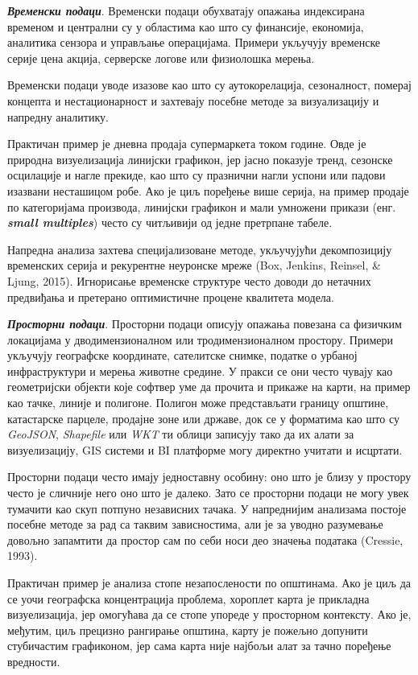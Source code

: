 \textbf{\textit{Временски подаци}}. Временски подаци обухватају опажања индексирана временом и централни су у областима као што су финансије, економија, аналитика сензора и управљање операцијама. Примери укључују временске серије цена акција, серверске логове или физиолошка мерења.

Временски подаци уводе изазове као што су аутокорелација, сезоналност, померај концепта и нестационарност и захтевају посебне методе за визуализацију и напредну аналитику.

Практичан пример је дневна продаја супермаркета током године. Овде је природна визуелизација линијски графикон, јер јасно показује тренд, сезонске осцилације и нагле прекиде, као што су празнични нагли успони или падови изазвани несташицом робе. Ако је циљ поређење више серија, на пример продаје по категоријама производа, линијски графикон и мали умножени прикази (енг. \textbf{\textit{small multiples}}) често су читљивији од једне претрпане табеле.

Напредна анализа захтева специјализоване методе, укључујући декомпозицију временских серија и рекурентне неуронске мреже (Box, Jenkins, Reinsel, \& Ljung, 2015). Игнорисање временске структуре често доводи до нетачних предвиђања и претерано оптимистичне процене квалитета модела.

\textbf{\textit{Просторни подаци}}. Просторни подаци описују опажања повезана са физичким локацијама у дводимензионалном или тродимензионалном простору. Примери укључују географске координате, сателитске снимке, податке о урбаној инфраструктури и мерења животне средине. У пракси се они често чувају као геометријски објекти које софтвер уме да прочита и прикаже на карти, на пример као тачке, линије и полигоне. Полигон може представљати границу општине, катастарске парцеле, продајне зоне или државе, док се у форматима као што су \textit{GeoJSON}, \textit{Shapefile} или \textit{WKT} ти облици записују тако да их алати за визуелизацију, GIS системи и BI платформе могу директно учитати и исцртати.

Просторни подаци често имају једноставну особину: оно што је близу у простору често је сличније него оно што је далеко. Зато се просторни подаци не могу увек тумачити као скуп потпуно независних тачака. У напреднијим анализама постоје посебне методе за рад са таквим зависностима, али је за уводно разумевање довољно запамтити да простор сам по себи носи део значења података (Cressie, 1993).

Практичан пример је анализа стопе незапослености по општинама. Ако је циљ да се уочи географска концентрација проблема, хороплет карта је прикладна визуелизација, јер омогућава да се стопе упореде у просторном контексту. Ако је, међутим, циљ прецизно рангирање општина, карту је пожељно допунити стубичастим графиконом, јер сама карта није најбољи алат за тачно поређење вредности.

